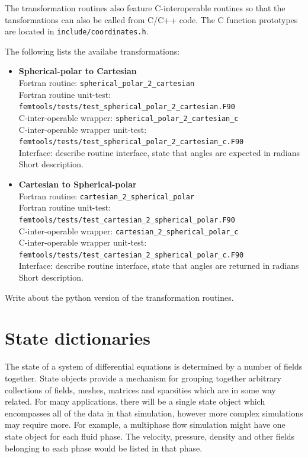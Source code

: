 \documentclass[a4paper, 11pt]{book}
\newcommand{\targetlabel}[1]{\hypertarget{#1}{}\label{#1}}
\begin{document}
\par
The transformation routines also feature C-interoperable routines so that the
tansformations can also be called from C/C++ code. The C function prototypes are
located in \lstinline{include/coordinates.h}.
\par
The following lists the availabe transformations:
\begin{itemize}
\item{\textbf{Spherical-polar to Cartesian}}\\
Fortran routine: \lstinline{spherical_polar_2_cartesian}\\
Fortran routine unit-test: \lstinline{femtools/tests/test_spherical_polar_2_cartesian.F90}\\
C-inter-operable wrapper: \lstinline{spherical_polar_2_cartesian_c}\\
C-inter-operable wrapper unit-test: \lstinline{femtools/tests/test_spherical_polar_2_cartesian_c.F90}\\
Interface: describe routine interface, state that angles are expected in radians\\
Short description.

\item{\textbf{Cartesian to Spherical-polar}}\\
Fortran routine: \lstinline{cartesian_2_spherical_polar}\\
Fortran routine unit-test: \lstinline{femtools/tests/test_cartesian_2_spherical_polar.F90}\\
C-inter-operable wrapper: \lstinline{cartesian_2_spherical_polar_c}\\
C-inter-operable wrapper unit-test: \lstinline{femtools/tests/test_cartesian_2_spherical_polar_c.F90}\\
Interface: describe routine interface, state that angles are returned in radians\\
Short description.
\end{itemize}
\par
Write about the python version of the transformation routines.



\chapter{State dictionaries}\targetlabel{chap:state}

The state of a system of differential equations is determined by a number of
fields together. State objects provide a mechanism for grouping together
arbitrary collections of fields, meshes, matrices and sparsities which are
in some way related. For many applications, there will be a single state
object which encompasses all of the data in that simulation, however more
complex simulations may require more. For example, a multiphase flow
simulation might have one state object for each fluid phase. The velocity,
pressure, density and other fields belonging to each phase would be listed
in that phase.
\end{document}
